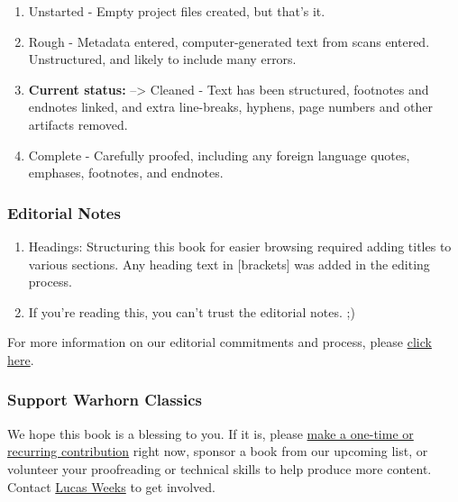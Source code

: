 \documentclass[
]{book}
\providecommand{\tightlist}{%
  \setlength{\itemsep}{0pt}\setlength{\parskip}{0pt}}
\begin{document}
\begin{enumerate}
\def\labelenumi{\arabic{enumi}.}
\setcounter{enumi}{-1}
\tightlist
\item
  Unstarted - Empty project files created, but that's it.
\item
  Rough - Metadata entered, computer-generated text from scans entered. Unstructured, and likely to include many errors.
\item
  \textbf{Current status:} --\textgreater{} Cleaned - Text has been structured, footnotes and endnotes linked, and extra line-breaks, hyphens, page numbers and other artifacts removed.
\item
  Complete - Carefully proofed, including any foreign language quotes, emphases, footnotes, and endnotes.
\end{enumerate}

\hypertarget{editorial-notes}{%
\subsubsection*{Editorial Notes}\label{editorial-notes}}

\begin{enumerate}
\def\labelenumi{\arabic{enumi}.}
\tightlist
\item
  Headings: Structuring this book for easier browsing required adding titles to various sections. Any heading text in {[}brackets{]} was added in the editing process.
\item
  If you're reading this, you can't trust the editorial notes. ;)
\end{enumerate}

For more information on our editorial commitments and process, please \href{https://classics.warhornmedia.com/editorial}{click here}.

\hypertarget{support-warhorn-classics}{%
\subsubsection*{Support Warhorn Classics}\label{support-warhorn-classics}}

We hope this book is a blessing to you. If it is, please \href{https://warhornmedia.com/give}{make a one-time or recurring contribution} right now, sponsor a book from our upcoming list, or volunteer your proofreading or technical skills to help produce more content. Contact \href{mailto:lucas@beggarsborn.com}{Lucas Weeks} to get involved.
\end{document}
